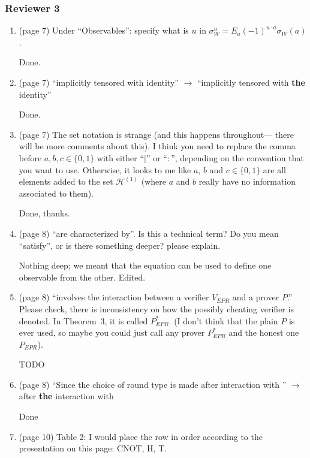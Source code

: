 \documentclass[12pt]{article}
\begin{document}
\subsubsection*{Reviewer 3}
\begin{enumerate}
\item (page 7) Under ``Observables'': specify what is $u$ in $\sigma_W^u = E_a(-1)^{u\cdot a} \sigma_W(a)$.

{\color{blue}Done.}

    \item (page 7) ``implicitly tensored with identity'' $\rightarrow$ ``implicitly tensored with \textbf{the} identity''
		
		{\color{blue}Done.}

\item (page 7) The set notation is strange (and this happens throughout--- there will be more comments about this). I think you need to replace the comma before $a,b,c \in \{0,1\}$ with either ``$\mid$'' or ``$:$'', depending on the convention that you want to use.  Otherwise, it looks to me like $a$, $b$ and $c\in \{0,1\}$ are all elements added to the set $\mathcal{H}^{(1)}$ (where $a$ and $b$ really have no information associated to them).

{\color{blue}Done, thanks.}

\item (page 8) ``are characterized by''. Is this a technical term? Do you mean ``satisfy'', or is there something deeper? please explain.

{\color{blue}Nothing deep; we meant that the equation can be used to define one observable from the other. Edited.}

    \item (page 8) ``involves the interaction between a verifier $V_{EPR}$ and a prover $P$.'' Please check, there is inconsistency on how the possibly cheating verifier is denoted. In Theorem~3, it is called $P_{EPR}^*$.  (I don't think that the plain $P$ is ever used, so maybe you could just call any prover $P^*_{EPR}$ and the honest one $P_{EPR}$).
		
		{\color{red} TODO}

        \item (page 8) ``Since the choice of round type is made after interaction with '' $\rightarrow$ after \textbf{the} interaction with
				
				{\color{blue}Done}
				
 \item (page 10) Table 2: I would place the row in order according to the presentation on this page: CNOT, H, T.


\end{enumerate}
\end{document}
